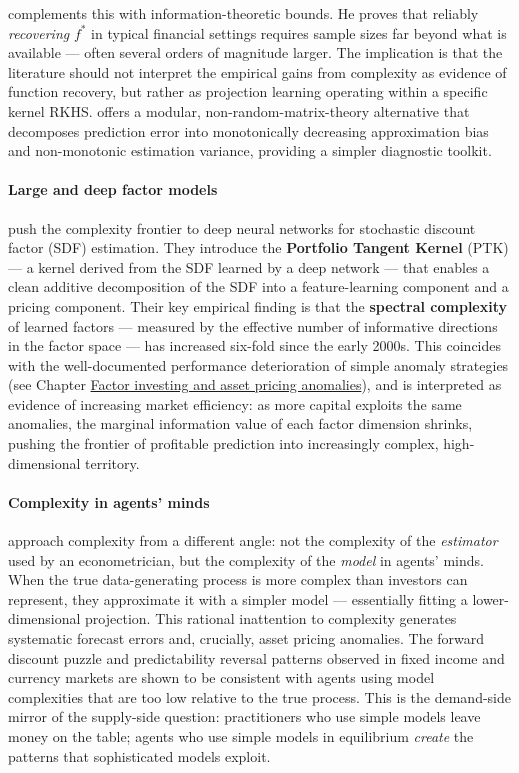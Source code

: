 \cite{fallahgoul2025high} complements this with information-theoretic bounds. He proves that reliably \textit{recovering} $f^*$ in typical financial settings requires sample sizes far beyond what is available --- often several orders of magnitude larger. The implication is that the literature should not interpret the empirical gains from complexity as evidence of function recovery, but rather as projection learning operating within a specific kernel RKHS. \cite{fallahgoul2025simpler} offers a modular, non-random-matrix-theory alternative that decomposes prediction error into monotonically decreasing approximation bias and non-monotonic estimation variance, providing a simpler diagnostic toolkit.

\paragraph{Large and deep factor models}

\cite{kelly2026large} push the complexity frontier to deep neural networks for stochastic discount factor (SDF) estimation. They introduce the \textbf{Portfolio Tangent Kernel} (PTK) --- a kernel derived from the SDF learned by a deep network --- that enables a clean additive decomposition of the SDF into a feature-learning component and a pricing component. Their key empirical finding is that the \textbf{spectral complexity} of learned factors --- measured by the effective number of informative directions in the factor space --- has increased six-fold since the early 2000s. This coincides with the well-documented performance deterioration of simple anomaly strategies (see Chapter \href{/chap-03-asset-pricing}{Factor investing and asset pricing anomalies}), and is interpreted as evidence of increasing market efficiency: as more capital exploits the same anomalies, the marginal information value of each factor dimension shrinks, pushing the frontier of profitable prediction into increasingly complex, high-dimensional territory.

\paragraph{Complexity in agents' minds}

\cite{molavi2024model} approach complexity from a different angle: not the complexity of the \textit{estimator} used by an econometrician, but the complexity of the \textit{model} in agents' minds. When the true data-generating process is more complex than investors can represent, they approximate it with a simpler model --- essentially fitting a lower-dimensional projection. This rational inattention to complexity generates systematic forecast errors and, crucially, asset pricing anomalies. The forward discount puzzle and predictability reversal patterns observed in fixed income and currency markets are shown to be consistent with agents using model complexities that are too low relative to the true process. This is the demand-side mirror of the supply-side question: practitioners who use simple models leave money on the table; agents who use simple models in equilibrium \textit{create} the patterns that sophisticated models exploit.

